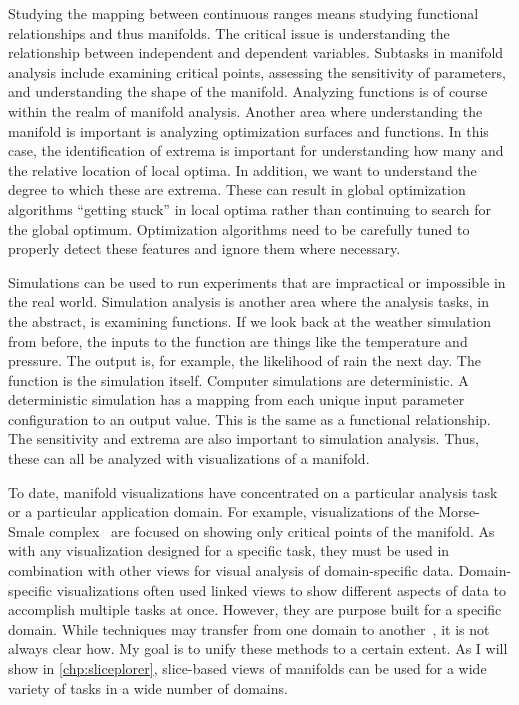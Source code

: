 Studying the mapping between continuous ranges means studying functional
relationships and thus manifolds.  The critical issue is understanding the
relationship between independent and dependent variables.  Subtasks in manifold
analysis include examining critical points, assessing the sensitivity of
parameters, and understanding the shape of the manifold.  Analyzing functions
is of course within the realm of manifold analysis.  Another area where
understanding the manifold is important is analyzing optimization surfaces and
functions.  In this case, the identification of extrema is important for
understanding how many and the relative location of local optima. In addition,
we want to understand the degree to which these are extrema. These can result
in global optimization algorithms ``getting stuck'' in local optima rather than
continuing to search for the global optimum. Optimization algorithms need to be
carefully tuned to properly detect these features and ignore them where
necessary.

Simulations can be used to run experiments that are impractical or impossible
in the real world.  Simulation analysis is another area where the analysis
tasks, in the abstract, is examining functions. If we look back at the weather
simulation from before, the inputs to the function are things like the
temperature and pressure.  The output is, for example, the likelihood of rain
the next day. The function is the simulation itself. Computer simulations are
deterministic.  A deterministic simulation has a mapping from each unique input
parameter configuration to an output value. This is the same as a functional
relationship. The sensitivity and extrema are also important to simulation
analysis.  Thus, these can all be analyzed with visualizations of a manifold.


To date, manifold visualizations have concentrated on a particular analysis
task or a particular application domain. For example, visualizations of the
Morse-Smale complex~\cite{MSvis} are focused on showing only critical points of
the manifold. As with any visualization designed for a specific task, they must
be used in combination with other views for visual analysis of domain-specific
data. Domain-specific visualizations often used linked views to show different
aspects of data to accomplish multiple tasks at once. However, they are purpose
built for a specific domain. While techniques may transfer from one domain to
another~\cite{Seldmair:2012}, it is not always clear how.
My goal is to unify these methods to a certain extent.
As I will show in \autoref{chp:sliceplorer}, slice-based views of manifolds
can be used for a wide variety of tasks in a wide number of domains.

